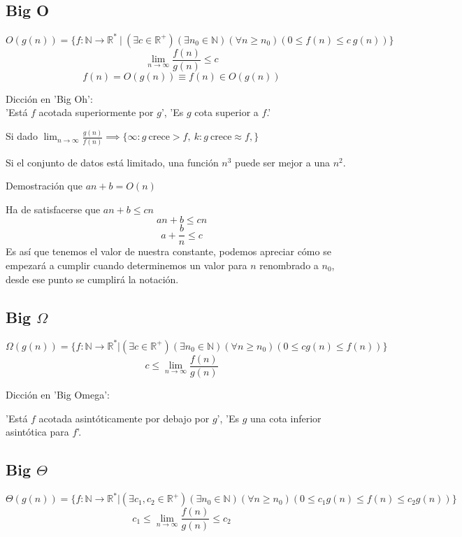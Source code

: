 \documentclass[tikz,11pt,fleqn]{book} %
\begin{document}
\subsection{Big O}
\begin{definition}$$
    O(g(n))
    =\{
        f: \mathbb N\to \mathbb R^*~|~(\exists c\in \mathbb R^+)
        (\exists n_0\in \mathbb N)
        (\forall n\ge n_0)
        (0\le f(n)\le c~g(n))
    \}
$$
$$
    \lim_{n\to\infty}\frac{f(n)}{g(n)}\leq c
$$$$
    f(n)=O(g(n))\equiv f(n)\in O(g(n))
$$
\end{definition}
\begin{remark}Dicción en 'Big Oh':\\
'Está $f$ acotada superiormente por $g$', 'Es $g$ cota superior a $f$.'
\end{remark}

Si dado $\lim_{n\to\infty}\frac{g(n)}{f(n)}\implies\{\infty: g~\text{crece} > f,~k:g~\text{crece} \approx f,\}$

Si el conjunto de datos está limitado, una función $n^3$ puede ser mejor a una $n^2$.

\begin{example}
    Demostración que $an+b=O(n)$
    
    Ha de satisfacerse que $an+b\le cn$
    $$
    an+b\le cn      $$$$
    a+\frac bn\le c 
    $$
    Es así que tenemos el valor de nuestra constante, podemos apreciar cómo se empezará a cumplir cuando determinemos un valor para $n$ renombrado a $n_0$, desde ese punto se cumplirá la notación.
\end{example}


\subsection{Big $\Omega$}
\begin{definition}$$
    \Omega(g(n)) =\{ f: \mathbb N \to \mathbb R^*  | (\exists c\in \mathbb R^+) (\exists n_0\in \mathbb N) (\forall n\ge n_0) ( 0\le cg(n) \le   f(n) ) \}
$$$$
    c\le\lim_{n\to\infty}\frac{f(n)}{g(n)}
$$\end{definition}


\begin{remark}Dicción en 'Big Omega':

    'Está $f$ acotada asintóticamente por debajo por $g$', 'Es $g$ una cota inferior asintótica para $f$'.
\end{remark}


\subsection{Big $\Theta$}
\begin{definition}
$$
    \Theta   (g(n)) =\{ f : \mathbb N \to \mathbb R^* | (\exists c_1, c_2 \in \mathbb R^+) ( \exists n_0\in \mathbb N) (\forall n \ge n_0) (0\le c_1 g(n) \le f(n) \le c_2 g(n)) \}
$$$$
    c_1\le\lim_{n\to\infty}\frac{f(n)}{g(n)}\le c_2
$$\end{definition}
\end{document}

